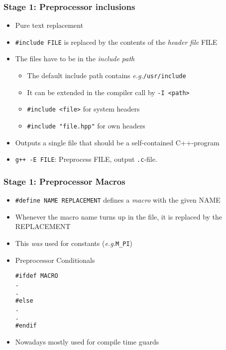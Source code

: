 \documentclass{slides}
\newcommand{\eg}{\textit{e.\thinspace g.}\xspace}
\begin{document}
\begin{frame}[fragile]
  \frametitle{Stage 1: Preprocessor inclusions}

    \begin{itemize}
    \item Pure text replacement
    \item \lstinline!#include FILE! is replaced by the contents of the
      \emph{header file} FILE
    \item The files have to be in the \emph{include path}
      \begin{itemize}
      \item The default include path contains \eg \texttt{/usr/include}
      \item It can be extended in the compiler call by \texttt{-I
          <path>}
      \item \lstinline!#include <file>! for system headers
      \item \lstinline!#include "file.hpp"! for own headers
      \end{itemize}
    \item Outputs a single file that should be a self-contained
      C++-program
    \item \lstinline!g++ -E FILE!: Preprocess FILE, output
      \lstinline!.c!-file.
    \end{itemize}
\end{frame}

\begin{frame}[fragile]
  \frametitle{Stage 1: Preprocessor Macros}
  \begin{itemize}
  \item \lstinline!#define NAME REPLACEMENT! defines a
    \emph{macro} with the given NAME
  \item Whenever the macro name turns up in the file, it is replaced
    by the REPLACEMENT
  \item This \emph{was} used for constants (\eg \lstinline!M_PI!)
  \item Preprocessor Conditionals
    \begin{lstlisting}
#ifdef MACRO
.
.
#else
.
.
#endif
    \end{lstlisting}
  \item Nowadays mostly used for compile time guards
  \end{itemize}
\end{frame}
\end{document}
